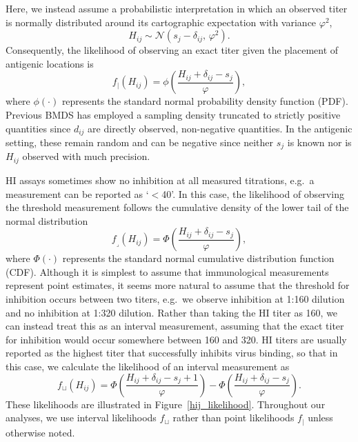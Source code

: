 \documentclass[11pt,oneside,letterpaper]{article}
\newcommand{\se}{s}									%
\newcommand{\point}{f_{\scriptscriptstyle \vert}}	%
\newcommand{\threshold}{f_{\textstyle \lrcorner}}	%
\newcommand{\interval}{f_{\sqcup}}					%
\newcommand{\mdssd}{\varphi}						%
\newcommand{\normal}{\mathcal{N}}					%
\begin{document}
Here, we instead assume a probabilistic interpretation in which an observed titer is normally distributed around its cartographic expectation with variance $\mdssd^2$,
\begin{equation} \label{hij}
	H_{ij} \sim \normal( \se_j - \delta_{ij}, \, \mdssd^2 ).
\end{equation}
Consequently, the likelihood of observing an exact titer given the placement of antigenic locations is 
\begin{equation} 
	\point(H_{ij}) = \phi \left( \frac{ H_{ij} + \delta_{ij} - \se_j }{ \mdssd } \right),
\end{equation}
where $\phi(\cdot)$ represents the standard normal probability density function (PDF).
Previous BMDS has employed a sampling density truncated to strictly positive quantities since $d_{ij}$ are directly observed, non-negative quantities.  
In the antigenic setting, these remain random and can be negative since neither $\se_j$ is known nor is $H_{ij}$ observed with much precision. 

HI assays sometimes show no inhibition at all measured titrations, e.g.\ a measurement can be reported as `$<$40'.
In this case, the likelihood of observing the threshold measurement follows the cumulative density of the lower tail of the normal distribution
\begin{equation} 
	\threshold(H_{ij}) = \Phi \left( \frac{ H_{ij} + \delta_{ij} - \se_j }{ \mdssd } \right),
\end{equation}
where $\Phi(\cdot)$ represents the standard normal cumulative distribution function (CDF).
Although it is simplest to assume that immunological measurements represent point estimates, it seems more natural to assume that the threshold for inhibition occurs between two titers, e.g.\ we observe inhibition at 1:160 dilution and no inhibition at 1:320 dilution.
Rather than taking the HI titer as 160, we can instead treat this as an interval measurement, assuming that the exact titer for inhibition would occur somewhere between 160 and 320.
HI titers are usually reported as the highest titer that successfully inhibits virus binding, so that in this case, we calculate the likelihood of an interval measurement as
\begin{equation} 
	\interval(H_{ij}) = \Phi \left( \frac{ H_{ij} + \delta_{ij} - \se_j + 1 }{ \mdssd } \right) - \Phi \left( \frac{ H_{ij} + \delta_{ij} - \se_j }{\mdssd} \right).
\end{equation}
These likelihoods are illustrated in Figure~\ref{hij_likelihood}.
Throughout our analyses, we use interval likelihoods $\interval$ rather than point likelihoods $\point$ unless otherwise noted.
\end{document}
